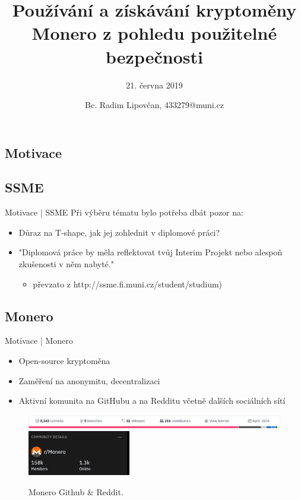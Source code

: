 \documentclass{beamer}
\title{Používání a získávání kryptoměny Monero z pohledu použitelné bezpečnosti} %
\subtitle{21. června 2019} %
\author{Bc. Radim Lipovčan, 433279@muni.cz}
\begin{document}
  \frame{\maketitle}


  \begin{darkframes}
    \section{Motivace}
    \subsection{SSME}
    \begin{frame}{Motivace | SSME}
    Při výběru tématu bylo potřeba dbát pozor na:
		\begin{itemize}
		\item Důraz na T-shape, jak jej zohlednit v diplomové práci?
		\item "Diplomová práce by měla reflektovat tvůj Interim Projekt nebo alespoň zkušenosti v něm nabyté." \begin{itemize}
		\item převzato z http://ssme.fi.muni.cz/student/studium)
		\end{itemize}
		\end{itemize}		     
     
	    \end{frame}
    \subsection{Monero}
    \begin{frame}{Motivace | Monero}
		\begin{itemize}
		\item Open-source kryptoměna
    	\item Zaměření na anonymitu, decentralizaci
     	\item Aktivní komunita na GitHubu a na Redditu včetně dalších sociálních sítí
		\end{itemize}  
		\begin{figure}
  \centering
  \includegraphics[width=1\textwidth]{monero-github.png}
  \includegraphics[width=0.4\textwidth]{monero-reddit.png}
  \caption{Monero Github \& Reddit.}  \label{fig:xray}
\end{figure}
		  

\end{frame}
\end{darkframes}
\end{document}
